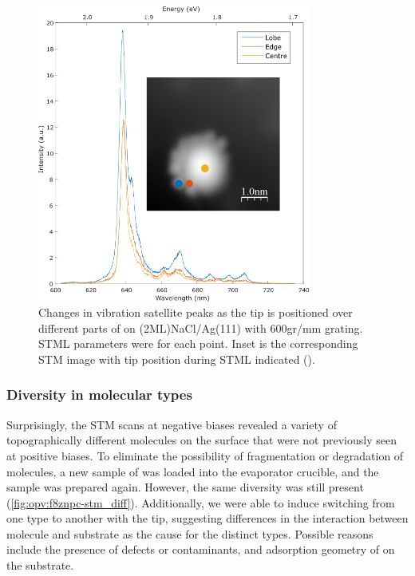 \begin{figure}[H]
    \centering
        \includegraphics[width=0.8\textwidth]{pictures/f8znpc_-ve_emission_inset600_position.png}
        \caption{Changes in vibration satellite peaks as the tip is positioned over different parts of  on (2ML)NaCl/Ag(111) with 600gr/mm grating. STML parameters were  for each point. Inset is the corresponding STM image with tip position during STML indicated ().}
        \label{fig:opv:f8znpc-stml_600gr}
\end{figure}



\subsubsection*{Diversity in molecular types}


Surprisingly, the \ac{STM} scans at negative biases revealed a variety of topographically different molecules on the surface that were not previously seen at positive biases. To eliminate the possibility of fragmentation or degradation of molecules, a new sample of  was loaded into the evaporator crucible, and the sample was prepared again. However, the same diversity was still present (\autoref{fig:opv:f8znpc-stm_diff}). Additionally, we were able to induce switching from one type to another with the tip, suggesting differences in the interaction between molecule and substrate as the cause for the distinct types. Possible reasons include the presence of defects or contaminants, and adsorption geometry of  on the substrate.


